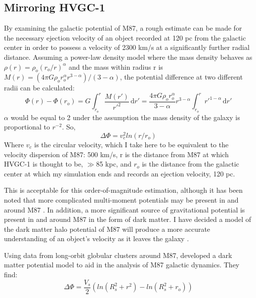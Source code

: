 \documentclass{aastex62}
\begin{document}
\subsection{Mirroring HVGC-1}
By examining the galactic potential of M87, a rough estimate can be made for the necessary ejection velocity of an object recorded at 120 pc from the galactic center in order to possess a velocity of 2300 km/s at a significantly further radial distance. Assuming a power-law density model where the mass density behaves as $\rho(r) = \rho_{o}(r_{o}/r)^\alpha$ and the mass within radius r is $M(r) = (4\pi G\rho_{o}r_{o}^\alpha r^{3-\alpha})/(3-\alpha)$, the potential difference at two different radii can be calculated:
\begin{equation}
\Phi(r) - \Phi(r_{o}) = G\int_{r_{o}}^{r} \! \frac{M(r')}{r'^2} \, \mathrm{d}r' = \frac{4\pi G\rho_{o}r_{o}^\alpha }{3-\alpha} r^{3-\alpha}\int_{r_{o}}^{r} \! r'^{1-\alpha} \, \mathrm{d}r'
\end{equation}
 $\alpha$ would be equal to 2 under the assumption the mass density of the galaxy is proportional to $r^{-2}$. So,
\begin{equation}
 \Delta\Phi= v_{c}^{2}ln(r/r_{o})
\end{equation}
Where $v_{c}$ is the circular velocity, which I take here to be equivalent to the velocity dispersion of M87: 500 km/s, r is the distance from M87 at which HVGC-1 is thought to be, $\gg$85 kpc, and $r_{o}$ is the distance from the galactic center at which my simulation ends and records an ejection velocity, 120 pc. 

This is acceptable for this order-of-magnitude estimation, although it has been noted that more complicated multi-moment potentials may be present in and around M87 \citep{mur14}. In addition, a more significant source of gravitational potential is present in and around M87 in the form of dark matter. I have decided a model of the dark matter halo potential of M87 will produce a more accurate understanding of an object's velocity as it leaves the galaxy \citep{zhu14}. 

Using data from long-orbit globular clusters around M87, \citet{zhu14} developed a dark matter potential model to aid in the analysis of M87 galactic dynamics. They find:
\begin{equation}
\Delta\Phi = \frac{V_{s}}{2}(ln(R_{s}^2 + r^2) - ln(R_{s}^2 + r_{o}))
\end{equation}
\end{document}
